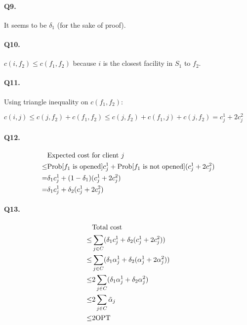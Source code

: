 \documentclass{article}
\begin{document}
\paragraph{Q9. }

It seems to be $\delta_1$ (for the sake of proof). 

\paragraph{Q10. }

$c(i, f_2) \le c(f_1, f_2)$ because $i$ is the closest facility in $S_1$ to $f_2$. 

\paragraph{Q11. }

Using triangle inequality on $c(f_1, f_2)$:

$c(i, j) \le c(j, f_2) + c(f_1, f_2) \le c(j, f_2) + c(f_1, j) + c(j, f_2) = c_j^1 + 2 c_j^2$

\paragraph{Q12. }

\begin{align*}
  & \text{Expected cost for client}\ j \\
  \le& \text{Prob}[f_1 \text{ is opened}] c_j^1 + \text{Prob}[f_1 \text{ is not opened}] (c_j^1 + 2c_j^2) \\
  = & \delta_1 c_j^1 + (1-\delta_1) (c_j^1 + 2c_j^2) \\
  = & \delta_1 c_j^1 + \delta_2 (c_j^1 + 2c_j^2) 
\end{align*}


\paragraph{Q13. }

\begin{align*}  
  & \text{Total cost } \\
  \le & \sum_{j \in C} (\delta_1 c_j^1 + \delta_2 (c_j^1 + 2c_j^2)) \\
  \le & \sum_{j \in C} (\delta_1 \alpha_j^1 + \delta_2 (\alpha_j^1 + 2 \alpha_j^2)) \\
  \le & 2 \sum_{j \in C} (\delta_1 \alpha_j^1 + \delta_2 \alpha_j^2) \\
  \le & 2 \sum_{j \in C} \tilde{\alpha}_j \\
  \le & 2 \text{OPT}
\end{align*}
\end{document}
